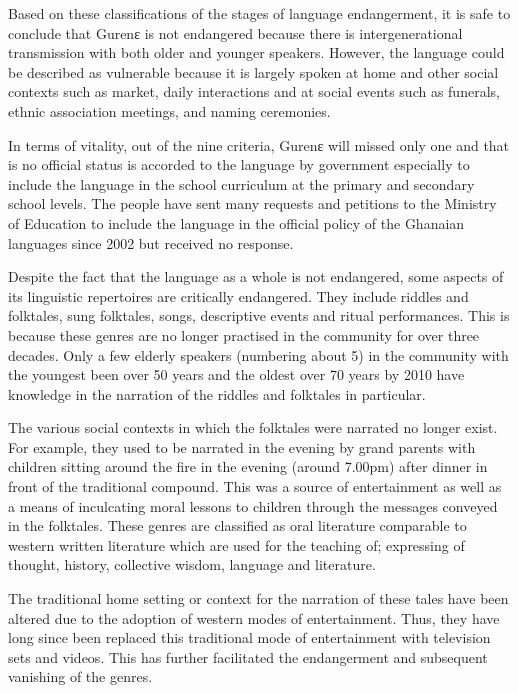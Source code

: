 \documentclass[output=paper,colorlinks,citecolor=brown]{langscibook}
\begin{document}
Based on these classifications of the stages of language endangerment, it is safe to conclude that Gurenɛ is not endangered because there is intergenerational transmission with both older and younger speakers. However, the language could be described as vulnerable because it is largely spoken at home and other social contexts such as market, daily interactions and at social events such as funerals, ethnic association meetings, and naming ceremonies.

In terms of vitality, out of the nine criteria, Gurenɛ will missed only one and that is no official status is accorded to the language by government especially to include the language in the school curriculum at the primary and secondary school levels. The people have sent many requests and petitions to the Ministry of Education to include the language in the official policy of the Ghanaian languages since 2002 but received no response.

Despite the fact that the language as a whole is not endangered, some aspects of its linguistic repertoires are critically endangered. They include riddles and folktales, sung folktales, songs, descriptive events and ritual performances. This is because these genres are no longer practised in the community for over three decades. Only a few elderly speakers (numbering about 5) in the community with the youngest been over 50 years and the oldest over 70 years by 2010 have knowledge in the narration of the riddles and folktales in particular. 

The various social contexts in which the folktales were narrated no longer exist. For example, they used to be narrated in the evening by grand parents with children sitting around the fire in the evening (around 7.00pm) after dinner in front of the traditional compound. This was a source of entertainment as well as a means of inculcating moral lessons to children through the messages conveyed in the folktales. These genres are classified as oral literature comparable to western written literature which are used for the teaching of; expressing of thought, history, collective wisdom, language and literature. 

The traditional home setting or context for the narration of these tales have been altered due to the adoption of western modes of entertainment. Thus, they have long since been replaced this traditional mode of entertainment with television sets and videos. This has further facilitated the endangerment and subsequent vanishing of the genres.
\end{document}
